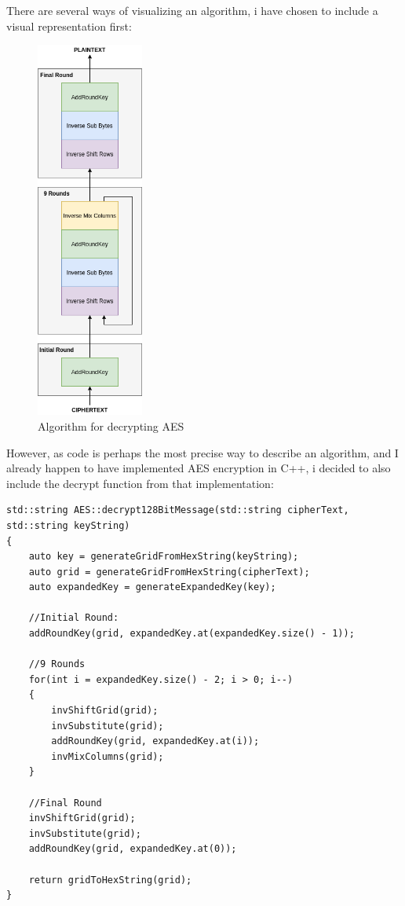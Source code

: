 \documentclass{article}
\begin{document}
There are several ways of visualizing an algorithm, i have chosen to include a visual representation first:
\begin{figure}[H]
 \centering
  \includegraphics[width=100pt]{img/decryptAES.png}
 \caption{Algorithm for decrypting AES}
 \end{figure}


However, as code is perhaps the most precise way to describe an algorithm, and I already happen to have implemented AES encryption in C++, i decided to also include the decrypt function from that implementation: 

\begin{lstlisting}
std::string AES::decrypt128BitMessage(std::string cipherText, std::string keyString)
{
	auto key = generateGridFromHexString(keyString);
	auto grid = generateGridFromHexString(cipherText);
	auto expandedKey = generateExpandedKey(key);

	//Initial Round:
	addRoundKey(grid, expandedKey.at(expandedKey.size() - 1));

	//9 Rounds
	for(int i = expandedKey.size() - 2; i > 0; i--)
	{
		invShiftGrid(grid);
		invSubstitute(grid);
		addRoundKey(grid, expandedKey.at(i));
		invMixColumns(grid);
	}

	//Final Round
	invShiftGrid(grid);
	invSubstitute(grid);
	addRoundKey(grid, expandedKey.at(0));

	return gridToHexString(grid);
}
\end{lstlisting}
\end{document}
